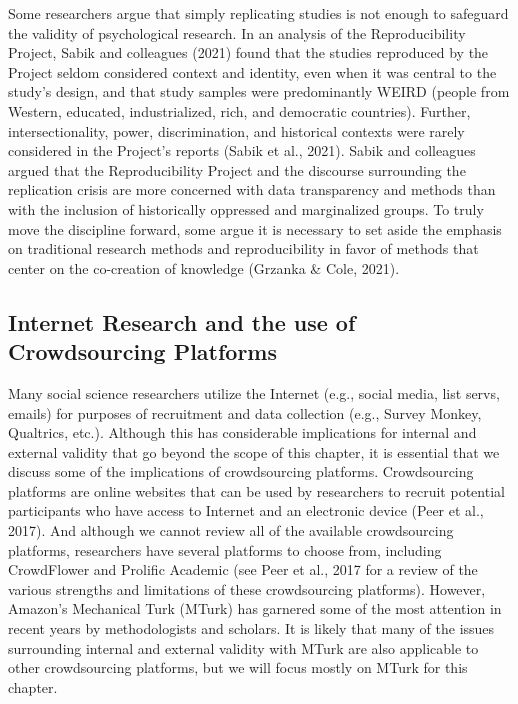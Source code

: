 \documentclass[
  11pt,
]{book}
\begin{document}
Some researchers argue that simply replicating studies is not enough to safeguard the validity of psychological research. In an analysis of the Reproducibility Project, Sabik and colleagues (2021) found that the studies reproduced by the Project seldom considered context and identity, even when it was central to the study's design, and that study samples were predominantly WEIRD (people from Western, educated, industrialized, rich, and democratic countries). Further, intersectionality, power, discrimination, and historical contexts were rarely considered in the Project's reports (Sabik et al., 2021). Sabik and colleagues argued that the Reproducibility Project and the discourse surrounding the replication crisis are more concerned with data transparency and methods than with the inclusion of historically oppressed and marginalized groups. To truly move the discipline forward, some argue it is necessary to set aside the emphasis on traditional research methods and reproducibility in favor of methods that center on the co-creation of knowledge (Grzanka \& Cole, 2021).

\subsection{Internet Research and the use of Crowdsourcing Platforms}\label{internet-research-and-the-use-of-crowdsourcing-platforms}

Many social science researchers utilize the Internet (e.g., social media, list servs, emails) for purposes of recruitment and data collection (e.g., Survey Monkey, Qualtrics, etc.). Although this has considerable implications for internal and external validity that go beyond the scope of this chapter, it is essential that we discuss some of the implications of crowdsourcing platforms. Crowdsourcing platforms are online websites that can be used by researchers to recruit potential participants who have access to Internet and an electronic device (Peer et al., 2017). And although we cannot review all of the available crowdsourcing platforms, researchers have several platforms to choose from, including CrowdFlower and Prolific Academic (see Peer et al., 2017 for a review of the various strengths and limitations of these crowdsourcing platforms). However, Amazon's Mechanical Turk (MTurk) has garnered some of the most attention in recent years by methodologists and scholars. It is likely that many of the issues surrounding internal and external validity with MTurk are also applicable to other crowdsourcing platforms, but we will focus mostly on MTurk for this chapter.
\end{document}
